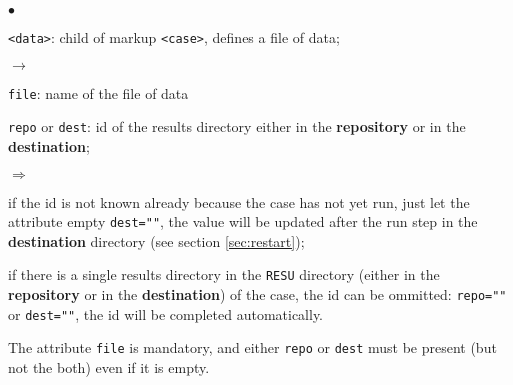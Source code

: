 \documentclass[a4paper,10pt,twoside]{csshortdoc}
\begin{document}
\begin{list}{$\bullet$}{}
\item \texttt{<data>}: child of markup \texttt{<case>}, defines a file of data;
\begin{list}{$\rightarrow$}{}
\item \texttt{file}: name of the file of data
\item \texttt{repo} or \texttt{dest}: id of the results directory either in the
\textbf{repository} or in the \textbf{destination};
\begin{list}{$\Rightarrow$}{}
\item if the id is not known already because the case has not yet run, just let
the attribute empty \texttt{dest=""}, the value will be updated after the run
step in the \textbf{destination} directory (see section \ref{sec:restart});
\item if there is a single results directory in the \texttt{RESU} directory
(either in the \textbf{repository} or in the \textbf{destination}) of the case,
the id can be ommitted: \texttt{repo=""} or \texttt{dest=""}, the id will be
completed automatically.
\end{list}
\end{list}
The attribute \texttt{file} is mandatory, and either \texttt{repo} or
\texttt{dest} must be present (but not the both) even if it is empty.


\end{list}
\end{document}
